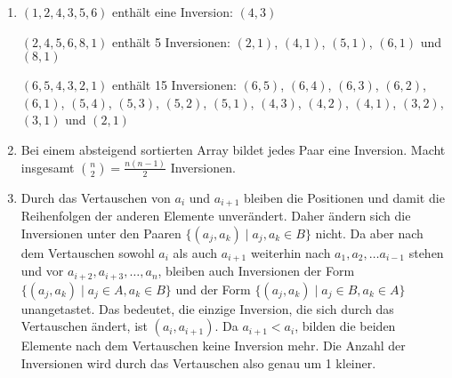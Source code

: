 \documentclass[11pt,a4paper]{article}
\begin{document}
\begin{loesung}
    \begin{enumerate}
        \item $(1, 2, 4, 3, 5, 6)$ enthält eine Inversion: $(4, 3)$ 

        $(2, 4, 5, 6, 8, 1)$ enthält 5 Inversionen: $(2, 1)$, $(4, 1)$, $(5, 1)$, $(6, 1)$ und $(8, 1)$ 

        $(6, 5, 4, 3, 2, 1)$ enthält 15 Inversionen: $(6, 5)$, $(6, 4)$, $(6, 3)$, $(6, 2)$, $(6, 1)$, $(5, 4)$, $(5, 3)$, $(5, 2)$, $(5, 1)$, $(4, 3)$, $(4, 2)$, $(4, 1)$, $(3, 2)$, $(3, 1)$ und $(2, 1)$

        \item Bei einem absteigend sortierten Array bildet jedes Paar eine Inversion. Macht insgesamt $\binom{n}{2} = \frac{n (n - 1)}{2}$ Inversionen.


        \item 
        Durch das Vertauschen von $a_i$ und $a_{i + 1}$ bleiben die Positionen und damit die Reihenfolgen der anderen Elemente unverändert. Daher ändern sich die Inversionen unter den Paaren $\{(a_j, a_k) \mid a_j, a_k \in B\}$ nicht.
        Da aber nach dem Vertauschen sowohl $a_i$ als auch $a_{i + 1}$ weiterhin nach $a_1, a_2, \ldots a_{i - 1}$ stehen und vor $a_{i + 2}, a_{i + 3}, \ldots, a_n$, bleiben auch Inversionen der Form $\{(a_j, a_k) \mid a_j \in A, a_k \in B\}$ und der Form $\{(a_j, a_k) \mid a_j \in B, a_k \in A\}$ unangetastet.
        Das bedeutet, die einzige Inversion, die sich durch das Vertauschen ändert, ist $(a_i, a_{i + 1})$. 
        Da $a_{i + 1} < a_i$, bilden die beiden Elemente nach dem Vertauschen keine Inversion mehr.
        Die Anzahl der Inversionen wird durch das Vertauschen also genau um 1 kleiner.


\end{enumerate}
\end{loesung}
\end{document}
